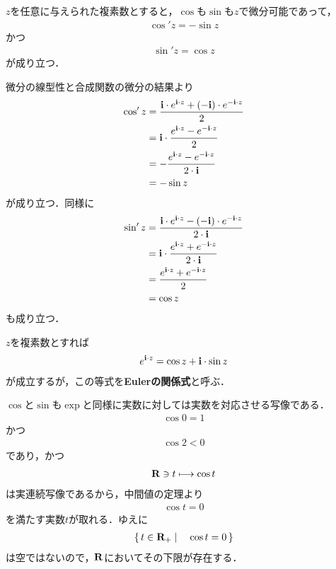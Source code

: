 	\begin{screen}
		\begin{thm}
		\label{thm:derivatives_of_trigonometric_functions}
			$z$を任意に与えられた複素数とすると，$\cos$も$\sin$も$z$で微分可能であって，
			\begin{align}
				\cos'{z} = - \sin{z}
			\end{align}
			かつ
			\begin{align}
				\sin'{z} = \cos{z}
			\end{align}
			が成り立つ．
		\end{thm}
	\end{screen}
	
	\begin{sketch}
		微分の線型性と合成関数の微分の結果より
		\begin{align}
			\cos'{z}
			&= \frac{\mathbf{i} \cdot e^{\mathbf{i} \cdot z} + (-\mathbf{i}) \cdot e^{-\mathbf{i} \cdot z}}{2} \\
			&= \mathbf{i} \cdot \frac{e^{\mathbf{i} \cdot z} - e^{-\mathbf{i} \cdot z}}{2} \\
			&= -\frac{e^{\mathbf{i} \cdot z} - e^{-\mathbf{i} \cdot z}}{2 \cdot \mathbf{i}} \\
			&= -\sin{z}
		\end{align}
		が成り立つ．同様に
		\begin{align}
			\sin'{z}
			&= \frac{\mathbf{i} \cdot e^{\mathbf{i} \cdot z} - (-\mathbf{i}) \cdot e^{-\mathbf{i} \cdot z}}{2 \cdot \mathbf{i}} \\
			&= \mathbf{i} \cdot \frac{e^{\mathbf{i} \cdot z} + e^{-\mathbf{i} \cdot z}}{2 \cdot \mathbf{i}} \\
			&= \frac{e^{\mathbf{i} \cdot z} + e^{-\mathbf{i} \cdot z}}{2} \\
			&= \cos{z}
		\end{align}
		も成り立つ．
		\QED
	\end{sketch}
	
	$z$を複素数とすれば
	\begin{align}
		e^{\mathbf{i} \cdot z} = \cos{z} + \mathbf{i} \cdot \sin{z}
	\end{align}
	が成立するが，この等式を{\bf Eulerの関係式}と呼ぶ．
	
	$\cos$と$\sin$も$\exp$と同様に実数に対しては実数を対応させる写像である．
	\begin{align}
		\cos{0} = 1
	\end{align}
	かつ
	\begin{align}
		\cos{2} < 0
	\end{align}
	であり，かつ
	\begin{align}
		\mathbf{R} \ni t \longmapsto \cos{t}
	\end{align}
	は実連続写像であるから，中間値の定理より
	\begin{align}
		\cos{t} = 0
	\end{align}
	を満たす実数$t$が取れる．ゆえに
	\begin{align}
		\left\{\, t \in \mathbf{R}_+ \mid \quad \cos{t} = 0\, \right\}
	\end{align}
	は空ではないので，$\mathbf{R}$においてその下限が存在する．
	

